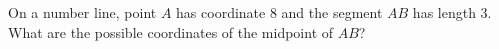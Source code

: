 On a number line, point $A$ has coordinate $8$ and the segment $AB$ has length $3$. What are the possible coordinates of the midpoint of $AB$?
